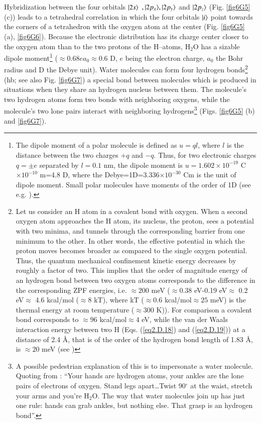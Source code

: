 \begin{subappendices}
Hybridization between the four orbitals $|{2s} \rangle$ $,|{2p_x} \rangle,|{2p_y} \rangle$ and $|{2p_z} \rangle$ (Fig. \ref{fig6G5} (c)) leads to a tetrahedral correlation in which the four orbitals $|{i} \rangle$ point towards the corners of a tetrahedron with the oxygen atom at the center (Fig. \ref{fig6G5} (a), \ref{fig6G6}). Because the electronic distribution has its charge center closer to the oxygen atom than to the two protons of the H--atoms, H$_2$O has a sizable dipole moment\footnote{The dipole moment of a polar molecule is defined as $u=ql$, where $l$ is the distance between the two charges $+q$ and $-q$. Thus, for two electronic charges $q=\pm e$ separated by $l=0.1$ nm, the dipole moment is $u=1.602\times 10^{-19}$ C$\times10^{-10}$ m=4.8 D, where the Debye=1D=3.336$\times10^{-30}$ Cm is the unit of dipole moment. Small polar molecules have moments of the order of 1D (see e.g. \cite{Israelachvili:85}).} ($\approx 0.68 ea_0\approx0.6$ D, $e$ being the electron charge, $a_0$ the Bohr radius and D the Debye unit). Water molecules can form four hydrogen bonds\footnote{Let us consider an H atom in a covalent bond with oxygen. When a second oxygen atom approaches the H atom, its nucleus, the proton, sees a potential with two minima, and tunnels through the corresponding barrier from one minimum to the other. In other words, the effective potential in which the proton moves becomes broader as compared to the single oxygen potential. Thus, the quantum mechanical confinement kinetic energy decreases by roughly a factor of two. This implies that the order of magnitude energy of an hydrogen bond between two oxygen atoms corresponds to the difference in the corresponding ZPF energies, i.e. $\approx200$ meV ($\approx 0.38$ eV-0.19 eV$\approx$ 0.2 eV$\approx$ 4.6 kcal/mol ($\approx8$ kT), where kT ($\approx0.6$ kcal/mol$\approx25$ meV) is the thermal energy at room temperature ($\approx300$ K)). For comparison a covalent  bond corresponds to $\approx96$ kcal/mol$\approx4$ eV, while the van der Waals interaction energy between two H (Eqs. (\ref{eq2.D.18}) and (\ref{eq2.D.19})) at a distance of 2.4 \AA, that is of the order of the hydrogen bond length of 1.83 \AA,  is $\approx20$ meV (see \cite{Povh:02})} (hb; see also Fig. \ref{fig6G7}) a special bond between molecules which is produced in situations when they share an hydrogen nucleus between them. The molecule's two hydrogen atoms form two bonds with neighboring oxygens, while the molecule's two lone pairs interact with neighboring hydrogens\footnote{A possible pedestrian explanation of this is to impersonate a water molecule. Quoting from \cite{Ball:03}: ``Your hands are hydrogen atoms, your ankles are the lone pairs of electrons of oxygen. Stand legs apart\dots Twist 90$^\circ$ at the waist, stretch your arms and you're H$_2$O. The way that water molecules join up has just one rule: hands can grab ankles, but nothing else. That grasp is an hydrogen bond''.} (Figs. \ref{fig6G5} (b) and \ref{fig6G7}). 



\end{subappendices}
